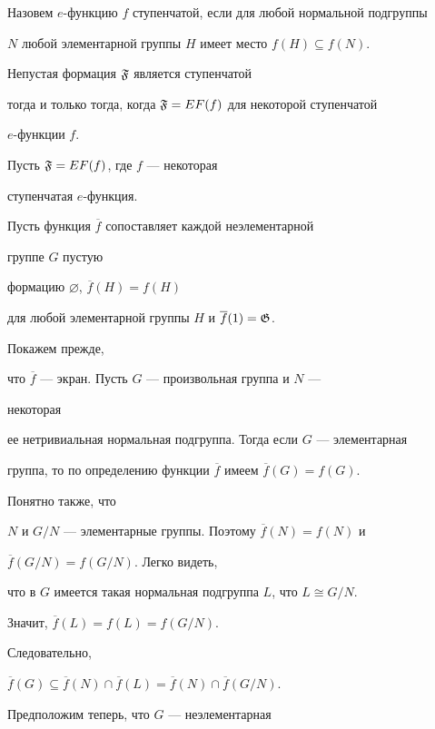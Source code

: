 Назовем $e$-функцию $f$ ступенчатой, если для любой нормальной подгруппы


$N$ любой элементарной группы $H$ имеет место $f(H)\subseteq f(N)$.





\begin{prop}


Непустая формация $\frak{F}$ является ступенчатой


тогда и только тогда, когда $\frak{F}=EF(f)$ для некоторой ступенчатой


$e$-функции $f$.


\end{prop}





\begin{pf}


Пусть $\frak{F}=EF(f)$, где $f$ --- некоторая


ступенчатая $e$-функция.


Пусть функция $\overline f$ сопоставляет каждой неэлементарной


группе $G$ пустую


формацию $\varnothing$, $\overline f(H)=f(H)$


для любой элементарной группы $H$ и $\overline f(1)=\frak{G}$.


Покажем прежде,


что $\overline f$ --- экран. Пусть $G$ --- произвольная группа и $N$ ---


некоторая


ее нетривиальная нормальная подгруппа. Тогда если $G$ --- элементарная


группа, то по определению функции $\overline f$ имеем $\overline f(G)=f(G)$.


Понятно также, что


$N$ и $G/N$ --- элементарные группы. Поэтому $\overline f(N)=f(N)$ и


$\overline f(G/N)=f(G/N)$. Легко видеть,


что в $G$ имеется такая нормальная подгруппа $L$, что $L\cong G/N$.


Значит, $\overline f(L)=f(L)=f(G/N)$.


Следовательно,


$\overline f(G)\subseteq\overline f(N)\cap\overline f(L)


=\overline f(N)\cap\overline f(G/N)$.


Предположим теперь, что $G$ --- неэлементарная



\end{pf}
